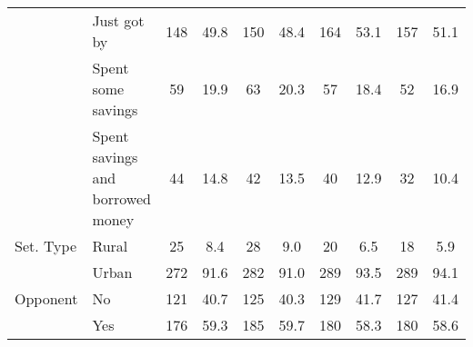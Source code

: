 \begin{table}[!htbp]
{\begin{tabular}[t]{llcccccccc}
 & Just got by & 148 & 49.8 & 150 & 48.4 & 164 & 53.1 & 157 & 51.1\\
 & Spent some savings & 59 & 19.9 & 63 & 20.3 & 57 & 18.4 & 52 & 16.9\\
 & Spent savings and
borrowed money & 44 & 14.8 & 42 & 13.5 & 40 & 12.9 & 32 & 10.4\\
Set. Type & Rural & 25 & 8.4 & 28 & 9.0 & 20 & 6.5 & 18 & 5.9\\
 & Urban & 272 & 91.6 & 282 & 91.0 & 289 & 93.5 & 289 & 94.1\\
Opponent & No & 121 & 40.7 & 125 & 40.3 & 129 & 41.7 & 127 & 41.4\\
 & Yes & 176 & 59.3 & 185 & 59.7 & 180 & 58.3 & 180 & 58.6\\
\bottomrule
\end{tabular}}
\end{table}
